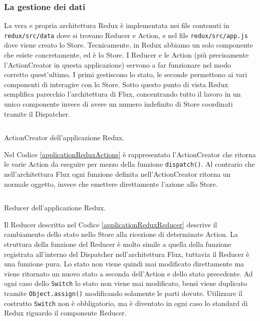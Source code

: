 \subsubsection*{La gestione dei dati}
La vera e propria architettura Redux è implementata nei file contenuti in \texttt{redux/src/data} dove si trovano Reducer e Action, e nel file \texttt{redux/src/app.js} dove viene creato lo Store. Tecnicamente, in Redux abbiamo un solo componente che esiste concretamente, ed è lo Store. I Reducer e le Action (più precisamente l'ActionCreator in questa applicazione) servono a far funzionare nel modo corretto quest'ultimo. I primi gestiscono lo stato, le seconde permettono ai vari componenti di interagire con lo Store.
Sotto questo punto di vista Redux semplifica parecchio l'architettura di Flux, concentrando tutto il lavoro in un unico componente invece di avere un numero indefinito di Store coordinati tramite il Dispatcher.

\begin{listing}[ht]
\inputminted{javascript}{sources/applicationReduxActions.js}
\caption{ActionCreator dell'applicazione Redux.} 
\label{applicationReduxActions} 
\end{listing}

Nel Codice \ref{applicationReduxActions} è rappresentato l'ActionCreator che ritorna le varie Action da eseguire per mezzo della funzione \texttt{dispatch()}. Al contrario che nell'architettura Flux ogni funzione definita nell'ActionCreator ritorna un normale oggetto, invece che emettere direttamente l'azione allo Store.

\begin{listing}[ht]
\inputminted{javascript}{sources/applicationReduxReducer.js}
\caption{Reducer dell'applicazione Redux.} 
\label{applicationReduxReducer} 
\end{listing}

Il Reducer descritto nel Codice \ref{applicationReduxReducer} descrive il cambiamento dello stato nello Store alla ricezione di determinate Action. La struttura della funzione del Reducer è molto simile a quella della funzione registrata all'interno del Dispatcher nell'architettura Flux, tuttavia il Reducer è una funzione pura. Lo stato non viene quindi mai modificato direttamente ma viene ritornato un nuovo stato a seconda dell'Action e dello stato precedente.
Ad ogni caso dello \texttt{Switch} lo stato non viene mai modificato, bensì viene duplicato tramite \texttt{Object.assign()} modificando solamente le parti dovute.
Utilizzare il costrutto \texttt{Switch} non è obbligatorio, ma è diventato in ogni caso lo standard di Redux riguardo il componente Reducer. 

